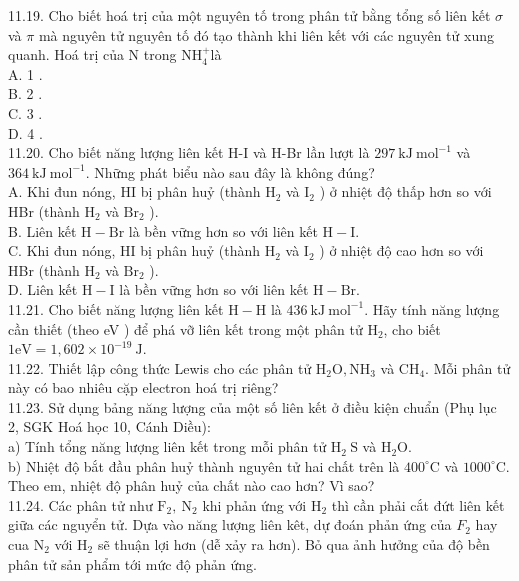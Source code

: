 \documentclass[10pt]{article}
\begin{document}
\begin{enumerate}
11.19. Cho biết hoá trị của một nguyên tố trong phân tử bằng tổng số liên kết $\sigma$ và $\pi$ mà nguyên tử nguyên tố đó tạo thành khi liên kết với các nguyên tử xung quanh. Hoá trị của N trong $\mathrm{NH}_{4}^{+}$là\\
A. 1 .\\
B. 2 .\\
C. 3 .\\
D. 4 .\\
11.20. Cho biết năng lượng liên kết H-I và H-Br lần lượt là $297 \mathrm{~kJ} \mathrm{~mol}^{-1}$ và $364 \mathrm{~kJ} \mathrm{~mol}^{-1}$. Những phát biểu nào sau đây là không đúng?\\
A. Khi đun nóng, HI bị phân huỷ (thành $\mathrm{H}_{2}$ và $\mathrm{I}_{2}$ ) ở nhiệt độ thấp hơn so với HBr (thành $\mathrm{H}_{2}$ và $\mathrm{Br}_{2}$ ).\\
B. Liên kết $\mathrm{H}-\mathrm{Br}$ là bền vững hơn so với liên kết $\mathrm{H}-\mathrm{I}$.\\
C. Khi đun nóng, HI bị phân huỷ (thành $\mathrm{H}_{2}$ và $\mathrm{I}_{2}$ ) ở nhiệt độ cao hơn so với HBr (thành $\mathrm{H}_{2}$ và $\mathrm{Br}_{2}$ ).\\
D. Liên kết $\mathrm{H}-\mathrm{I}$ là bền vững hơn so với liên kết $\mathrm{H}-\mathrm{Br}$.\\
11.21. Cho biết năng lượng liên kết $\mathrm{H}-\mathrm{H}$ là $436 \mathrm{~kJ} \mathrm{~mol}^{-1}$. Hãy tính năng lượng cần thiết (theo eV ) để phá vỡ liên kết trong một phân tử $\mathrm{H}_{2}$, cho biết $1 \mathrm{eV}=1,602 \times 10^{-19} \mathrm{~J}$.\\
11.22. Thiết lập công thức Lewis cho các phân tử $\mathrm{H}_{2} \mathrm{O}, \mathrm{NH}_{3}$ và $\mathrm{CH}_{4}$. Mỗi phân tử này có bao nhiêu cặp electron hoá trị riêng?\\
11.23. Sử dụng bảng năng lượng của một số liên kết ở điều kiện chuẩn (Phụ lục 2, SGK Hoá học 10, Cánh Diều):\\
a) Tính tổng năng lượng liên kết trong mỗi phân tử $\mathrm{H}_{2} \mathrm{~S}$ và $\mathrm{H}_{2} \mathrm{O}$.\\
b) Nhiệt độ bắt đầu phân huỷ thành nguyên tử hai chất trên là $400^{\circ} \mathrm{C}$ và $1000^{\circ} \mathrm{C}$. Theo em, nhiệt độ phân huỷ của chất nào cao hơn? Vì sao?\\
11.24. Các phân tử như $\mathrm{F}_{2}, \mathrm{~N}_{2}$ khi phản ứng với $\mathrm{H}_{2}$ thì cần phải cắt đứt liên kết giữa các nguyển tử. Dựa vào năng lượng liên kêt, dự đoán phản ứng của $F_{2}$ hay cua $\mathrm{N}_{2}$ với $\mathrm{H}_{2}$ sẽ thuận lợi hơn (dễ xảy ra hơn). Bỏ qua ảnh hưởng của độ bền phân tử sản phẩm tới mức độ phản ứng.\\

\end{enumerate}
\end{document}

